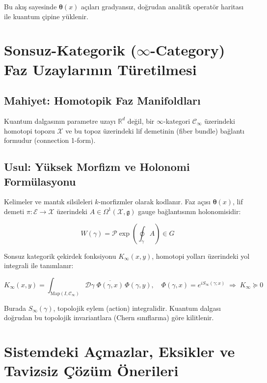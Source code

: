 \documentclass[11pt, a4paper]{article}
\begin{document}
Bu akış sayesinde $\bm{\theta}(x)$ açıları gradyansız, doğrudan analitik operatör haritası ile kuantum çipine yüklenir.

\section{Sonsuz-Kategorik ($\infty$-Category) Faz Uzaylarının Türetilmesi}

\subsection{Mahiyet: Homotopik Faz Manifoldları}
Kuantum dalgasının parametre uzayı $\mathbb{R}^d$ değil, bir $\infty$-kategori $\mathcal{C}_\infty$ üzerindeki homotopi topozu $\mathcal{X}$ ve bu topoz üzerindeki lif demetinin (fiber bundle) bağlantı formudur (connection 1-form).

\subsection{Usul: Yüksek Morfizm ve Holonomi Formülasyonu}
Kelimeler ve mantık silsileleri $k$-morfizmler olarak kodlanır. Faz açısı $\bm{\theta}(x)$, lif demeti $\pi: \mathcal{E} \to \mathcal{X}$ üzerindeki $A \in \Omega^1(\mathcal{X}, \mathfrak{g})$ gauge bağlantısının holonomisidir:

\begin{equation}
W(\gamma) = \mathcal{P} \exp \left( \oint_\gamma A \right) \in G
\end{equation}

Sonsuz kategorik çekirdek fonksiyonu $K_\infty(x, y)$, homotopi yolları üzerindeki yol integrali ile tanımlanır:

\begin{equation}
K_\infty(x, y) = \int_{\text{Map}(I, \mathcal{C}_\infty)} \mathcal{D}\gamma \; \overline{\Phi(\gamma, x)}\, \Phi(\gamma, y), \quad \Phi(\gamma, x) = e^{i S_\infty(\gamma; x)} \;\Longrightarrow\; K_\infty \succeq 0
\end{equation}

Burada $S_\infty(\gamma)$, topolojik eylem (action) integralidir. Kuantum dalgası doğrudan bu topolojik invariantlara (Chern sınıflarına) göre kilitlenir.

\section{Sistemdeki Açmazlar, Eksikler ve Tavizsiz Çözüm Önerileri}
\end{document}
